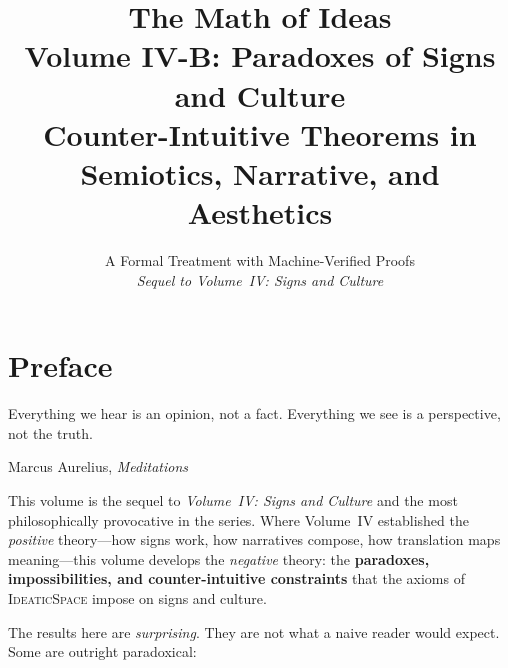 \documentclass[11pt,oneside]{book}
\title{\Huge\bfseries The Math of Ideas\\[0.3em]
\LARGE Volume IV-B: Paradoxes of Signs and Culture\\[0.5em]
\Large Counter-Intuitive Theorems in Semiotics, Narrative, and Aesthetics}
\author{A Formal Treatment with Machine-Verified Proofs\\[0.3em]
\normalsize\textit{Sequel to Volume~IV: Signs and Culture}}
\date{}
\theoremstyle{plain}
\theoremstyle{definition}
\theoremstyle{remark}
\begin{document}
\maketitle

\frontmatter

\chapter*{Preface}

\epigraph{Everything we hear is an opinion, not a fact.
Everything we see is a perspective, not the truth.}{Marcus Aurelius, \textit{Meditations}}

This volume is the sequel to \textit{Volume~IV: Signs and Culture} and
the most philosophically provocative in the series.  Where Volume~IV
established the \emph{positive} theory---how signs work, how narratives
compose, how translation maps meaning---this volume develops the
\emph{negative} theory: the \textbf{paradoxes, impossibilities, and
counter-intuitive constraints} that the axioms of \textsc{IdeaticSpace}
impose on signs and culture.

The results here are \emph{surprising}.  They are not what a naive
reader would expect.  Some are outright paradoxical:
\end{document}

